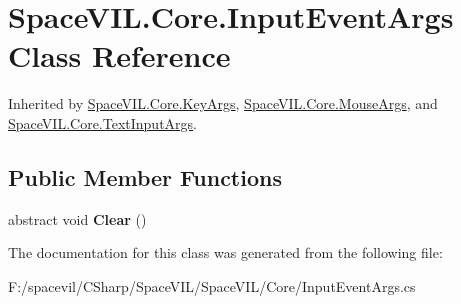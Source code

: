 \hypertarget{class_space_v_i_l_1_1_core_1_1_input_event_args}{}\section{Space\+V\+I\+L.\+Core.\+Input\+Event\+Args Class Reference}
\label{class_space_v_i_l_1_1_core_1_1_input_event_args}


Inherited by \mbox{\hyperlink{class_space_v_i_l_1_1_core_1_1_key_args}{Space\+V\+I\+L.\+Core.\+Key\+Args}}, \mbox{\hyperlink{class_space_v_i_l_1_1_core_1_1_mouse_args}{Space\+V\+I\+L.\+Core.\+Mouse\+Args}}, and \mbox{\hyperlink{class_space_v_i_l_1_1_core_1_1_text_input_args}{Space\+V\+I\+L.\+Core.\+Text\+Input\+Args}}.

\subsection*{Public Member Functions}
\begin{DoxyCompactItemize}
\item 
\mbox{\label{class_space_v_i_l_1_1_core_1_1_input_event_args_ac8e757e62418b3d0ae057b93e3cae76c}} 
abstract void {\bfseries Clear} ()
\end{DoxyCompactItemize}


The documentation for this class was generated from the following file\+:\begin{DoxyCompactItemize}
\item 
F\+:/spacevil/\+C\+Sharp/\+Space\+V\+I\+L/\+Space\+V\+I\+L/\+Core/Input\+Event\+Args.\+cs\end{DoxyCompactItemize}
